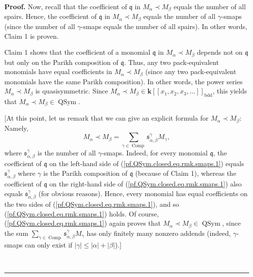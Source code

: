 \documentclass
[numbers=enddot,12pt,final,onecolumn,notitlepage,abstracton]{scrartcl}%
\theoremstyle{definition}
\newenvironment{proof}[1][Proof]{\noindent\textbf{#1.} }{\ \rule{0.5em}{0.5em}}
\newenvironment{verlong}{}{}
\let\sumnonlimits\sum
\renewcommand{\sum}{\sumnonlimits\limits}
\begin{document}
\begin{proof}
\begin{verlong}
Now, recall that the coefficient of $\mathfrak{q}$ in $M_{\alpha}\left.
\prec\right.  M_{\beta}$ equals the number of all spairs. Hence, the
coefficient of $\mathfrak{q}$ in $M_{\alpha}\left.  \prec\right.  M_{\beta}$
equals the number of all $\gamma$-smaps (since the number of all $\gamma
$-smaps equals the number of all spairs). In other words, Claim 1 is proven.
\end{verlong}

Claim 1 shows that the coefficient of a monomial $\mathfrak{q}$ in $M_{\alpha
}\left.  \prec\right.  M_{\beta}$ depends not on $\mathfrak{q}$ but only on
the Parikh composition of $\mathfrak{q}$. Thus, any two pack-equivalent
monomials have equal coefficients in $M_{\alpha}\left.  \prec\right.
M_{\beta}$ (since any two pack-equivalent monomials have the same Parikh
composition). In other words, the power series $M_{\alpha}\left.
\prec\right.  M_{\beta}$ is quasisymmetric. Since $M_{\alpha}\left.
\prec\right.  M_{\beta}\in\mathbf{k}\left[  \left[  x_{1},x_{2},x_{3}%
,\ldots\right]  \right]  _{\operatorname*{bdd}}$, this yields that $M_{\alpha
}\left.  \prec\right.  M_{\beta}\in\operatorname*{QSym}$.

[At this point, let us remark that we can give an explicit formula for
$M_{\alpha}\left.  \prec\right.  M_{\beta}$: Namely,%
\begin{equation}
M_{\alpha}\left.  \prec\right.  M_{\beta}=\sum_{\gamma\in\operatorname*{Comp}%
}\mathfrak{s}_{\alpha,\beta}^{\gamma}M_{\gamma},
\label{pf.QSym.closed.eq.rmk.smaps.1}%
\end{equation}
where $\mathfrak{s}_{\alpha,\beta}^{\gamma}$ is the number of all $\gamma
$-smaps. Indeed, for every monomial $\mathfrak{q}$, the coefficient of
$\mathfrak{q}$ on the left-hand side of (\ref{pf.QSym.closed.eq.rmk.smaps.1})
equals $\mathfrak{s}_{\alpha,\beta}^{\gamma}$ where $\gamma$ is the Parikh
composition of $\mathfrak{q}$ (because of Claim 1), whereas the coefficient of
$\mathfrak{q}$ on the right-hand side of (\ref{pf.QSym.closed.eq.rmk.smaps.1})
also equals $\mathfrak{s}_{\alpha,\beta}^{\gamma}$ (for obvious reasons).
Hence, every monomial has equal coefficients on the two sides of
(\ref{pf.QSym.closed.eq.rmk.smaps.1}), and so
(\ref{pf.QSym.closed.eq.rmk.smaps.1}) holds. Of course,
(\ref{pf.QSym.closed.eq.rmk.smaps.1}) again proves that $M_{\alpha}\left.
\prec\right.  M_{\beta}\in\operatorname*{QSym}$, since the sum $\sum
_{\gamma\in\operatorname*{Comp}}\mathfrak{s}_{\alpha,\beta}^{\gamma}M_{\gamma
}$ has only finitely many nonzero addends (indeed, $\gamma$-smaps can only
exist if $\left\vert \gamma\right\vert \leq\left\vert \alpha\right\vert
+\left\vert \beta\right\vert $).]


\end{proof}
\end{document}
